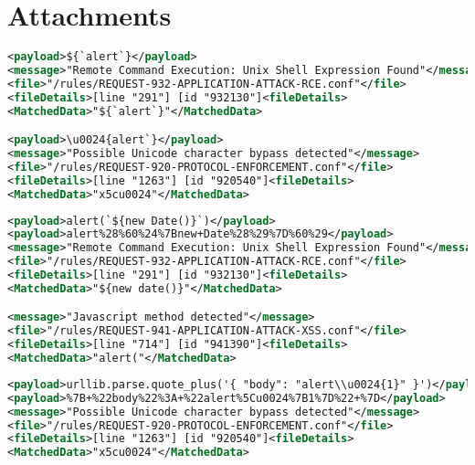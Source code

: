 \section{Attachments}

%


\begin{lstlisting}[style=ruleStyle, language=XML, caption=unicode tests \$\{`alert`\}, label={lst:jsonunicodetests}]
<payload>${`alert`}</payload>
<message>"Remote Command Execution: Unix Shell Expression Found"</message>
<file>"/rules/REQUEST-932-APPLICATION-ATTACK-RCE.conf"</file>
<fileDetails>[line "291"] [id "932130"]<fileDetails>
<MatchedData>"${`alert`}"</MatchedData>

<payload>\u0024{alert`}</payload>
<message>"Possible Unicode character bypass detected"</message>
<file>"/rules/REQUEST-920-PROTOCOL-ENFORCEMENT.conf"</file>
<fileDetails>[line "1263"] [id "920540"]<fileDetails>
<MatchedData>"x5cu0024"</MatchedData>
\end{lstlisting}


\begin{lstlisting}[style=ruleStyle, language=XML, caption=url encoded example blocked, label={lst:urlencodedexampleblocked}]
<payload>alert(`${new Date()}`)</payload>
<payload>alert%28%60%24%7Bnew+Date%28%29%7D%60%29</payload>
<message>"Remote Command Execution: Unix Shell Expression Found"</message>
<file>"/rules/REQUEST-932-APPLICATION-ATTACK-RCE.conf"</file>
<fileDetails>[line "291"] [id "932130"]<fileDetails>
<MatchedData>"${new date()}"</MatchedData>

<message>"Javascript method detected"</message>
<file>"/rules/REQUEST-941-APPLICATION-ATTACK-XSS.conf"</file>
<fileDetails>[line "714"] [id "941390"]<fileDetails>
<MatchedData>"alert("</MatchedData>
\end{lstlisting}


\begin{lstlisting}[style=ruleStyle, language=XML, caption=unicode escape in json with additional percent encoding, label={lst:jsonunicodeurlenctest}]
<payload>urllib.parse.quote_plus('{ "body": "alert\\u0024{1}" }')</payload>
<payload>%7B+%22body%22%3A+%22alert%5Cu0024%7B1%7D%22+%7D</payload>
<message>"Possible Unicode character bypass detected"</message>
<file>"/rules/REQUEST-920-PROTOCOL-ENFORCEMENT.conf"</file>
<fileDetails>[line "1263"] [id "920540"]<fileDetails>
<MatchedData>"x5cu0024"</MatchedData>
\end{lstlisting}
